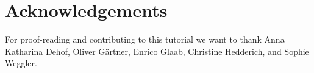 \documentclass[12pt,twoside]{report}
\begin{document}
\chapter*{Acknowledgements}

For proof-reading and contributing to this tutorial we want to thank
Anna Katharina Dehof, Oliver G\"{a}rtner, Enrico Glaab, Christine Hedderich,
and Sophie Weggler.

\newpage
{}
\small
\printindex
\normalsize

\renewcommand{\bibname}{References}


\end{document}
